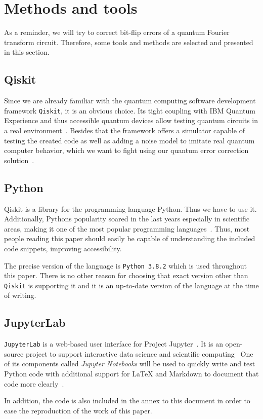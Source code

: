\section{Methods and tools}
\label{sec:methods-and-tools}

As a reminder, we will try to correct bit-flip errors of a quantum Fourier transform circuit.
Therefore, some tools and methods are selected and presented in this section.

\subsection{Qiskit}
\label{subsec:qiskit}

Since we are already familiar with the quantum computing software development framework \texttt{Qiskit}, it is an obvious choice.
Its tight coupling with IBM Quantum Experience and thus accessible quantum devices allow testing quantum circuits in a real environment~\cite{IBMQAccount}.
Besides that the framework offers a simulator capable of testing the created code as well as adding a noise model to imitate real quantum computer behavior, which we want to fight using our quantum error correction solution~\cite{QiskitNoiseModel}.

\subsection{Python}
\label{subsec:python}

Qiskit is a library for the programming language Python.
Thus we have to use it.
Additionally, Pythons popularity soared in the last years especially in scientific areas, making it one of the most popular programming languages~\cite{StackOverFlowDevSurveyTechnolgies}.
Thus, most people reading this paper should easily be capable of understanding the included code snippets, improving accessibility.

The precise version of the language is \texttt{Python 3.8.2} which is used throughout this paper.
There is no other reason for choosing that exact version other than \texttt{Qiskit} is supporting it and it is an up-to-date version of the language at the time of writing.

\subsection{JupyterLab}
\label{subsec:jupyter-lab}

\texttt{JupyterLab} is a web-based user interface for Project Jupyter~\cite{JupyterLabDocs}.
It is an open-source project to support interactive data science and scientific computing~\cite{ProjectJupyter}
One of its components called \emph{Jupyter Notebooks} will be used to quickly write and test Python code with additional support for LaTeX and Markdown to document that code more clearly~\cite{JupyterLabOverview}.

In addition, the code is also included in the annex to this document in order to ease the reproduction of the work of this paper.
